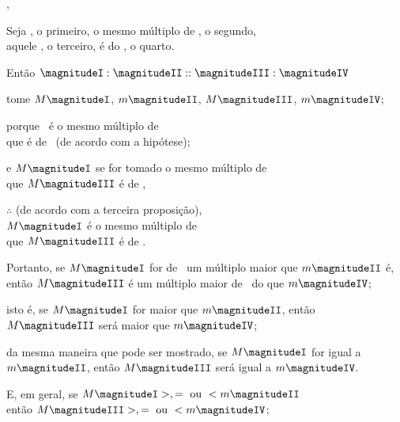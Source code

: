 \documentclass[booklanguage=brazilian]{byrnebook}
\begin{document}
,\label{prop:V.C} %

\begin{center}
Seja , o primeiro, o mesmo múltiplo de , o segundo, \\
aquele , o terceiro, é do , o quarto.

Então $\magnitudeI : \magnitudeII :: \magnitudeIII : \magnitudeIV$

tome $M \magnitudeI$, $m \magnitudeII$, $M \magnitudeIII$, $m \magnitudeIV$;

porque \magnitudeI\ é o mesmo múltiplo de \magnitudeII \\
que \magnitudeIII é de \magnitudeIV\ (de acordo com a hipótese);

e $M \magnitudeI$ se for tomado o mesmo múltiplo de \magnitudeI \\
que $M \magnitudeIII$ é de \magnitudeIII,

$\therefore$ (de acordo com a terceira proposição),\\
$M \magnitudeI$ é o mesmo múltiplo de \magnitudeII \\
que $M \magnitudeIII$ é de \magnitudeIV.

Portanto, se $M \magnitudeI$ for de \magnitudeII\ um múltiplo maior que $m \magnitudeII$ é, \\
então $M \magnitudeIII$ é um múltiplo maior de \magnitudeIV\ do que $m \magnitudeIV$;

isto é, se $M \magnitudeI$ for maior que $m \magnitudeII$, então $M \magnitudeIII$ será maior que $m \magnitudeIV$;

da mesma maneira que pode ser mostrado, se $M \magnitudeI$ for igual a $m \magnitudeII$, então $M \magnitudeIII$ será igual a $m \magnitudeIV$.

E, em geral, se $M \magnitudeI >, = \mbox{ ou } < m \magnitudeII$\\
então $M \magnitudeIII >, = \mbox{ ou } < m \magnitudeIV$;


\end{center}
\end{document}
